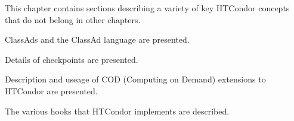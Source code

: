 This chapter contains sections describing a variety of key
HTCondor concepts that do not belong in other chapters.

ClassAds and the ClassAd language are presented.

Details of checkpoints are presented.

Description and useage of COD (Computing on Demand) extensions to HTCondor
are presented.

The various hooks that HTCondor implements are described.







